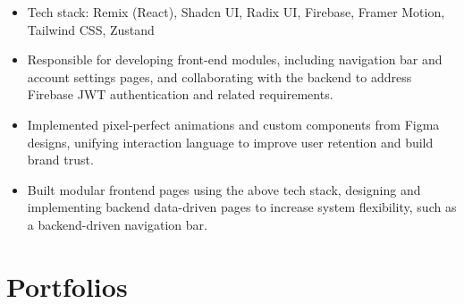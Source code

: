 \documentclass{resume}
\newcommand{\en}[1]{#1}
\newcommand{\zh}[1]{}
\begin{document}
\en{}
\zh{\datedsubsection{\textbf{\href{https://www.trychad.com/}{Chad}}}{}}
\en{}
\zh{\role{前端工程师}{}}
\begin{itemize}
    \item \en{Tech stack: Remix (React), Shadcn UI, Radix UI, Firebase, Framer Motion, Tailwind CSS, Zustand}
          \zh{技术栈：Remix（React）、Shadcn UI、Radix UI、Firebase、Framer Motion、Tailwind CSS、Zustand}
    \item \en{Responsible for developing front-end modules, including navigation bar and account settings pages, and collaborating with the backend to address Firebase JWT authentication and related requirements.}
          \zh{负责前端模块开发，包括导航栏、账户设置页等，配合后端通过JWT解决 Firebase 认证问题等需求。}
    \item \en{Implemented pixel-perfect animations and custom components from Figma designs, unifying interaction language to improve user retention and build brand trust.}
          \zh{实现Figma中 1:1 动画效果和自定义组件，统一交互语言，提升用户留存率，构建品牌信任。}
    \item \en{Built modular frontend pages using the above tech stack, designing and implementing backend data-driven pages to increase system flexibility, such as a backend-driven navigation bar.}
          \zh{使用上述技术栈构建前端页面，模块化设计，设计并实现基于后端数据驱动型页面，提高系统灵活度。如后端数据驱动导航栏。}
\end{itemize}

\section{\en{Portfolios}\zh{个人项目}}
\end{document}
